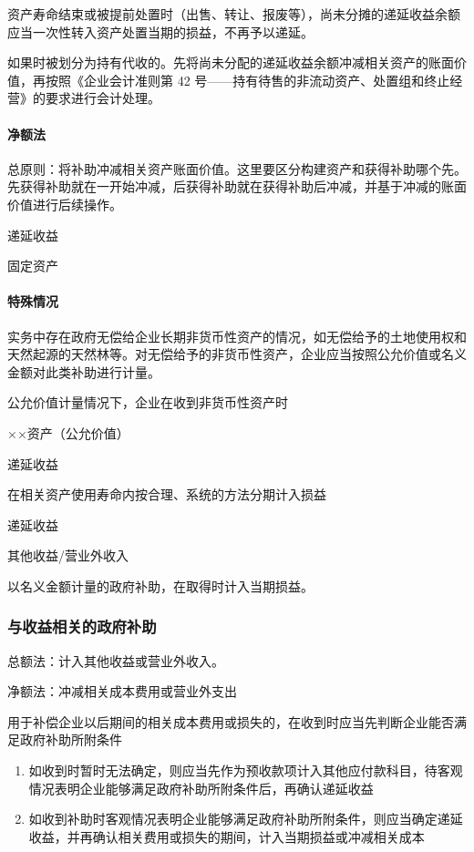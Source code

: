 \documentclass[UTF8,12pt]{ctexart}
\newenvironment{Dr}{%
	\begin{list}{}%
		{
			\setlength{\leftmargin}{2em}
			\setlength{\labelwidth}{2em}
			\setlength{\labelsep}{0pt}
			\setlength{\itemindent}{0pt}
			\setlength{\listparindent}{0pt}
			\setlength{\parsep}{0pt}
			\setlength{\topsep}{0pt}
		}
		\item[\textbf{借：}]
	}{%
	\end{list}
}
\newenvironment{Cr}{%
	\begin{list}{}%
		{
			\setlength{\leftmargin}{2em}
			\setlength{\labelwidth}{2em}
			\setlength{\labelsep}{0pt}
			\setlength{\itemindent}{0pt}
			\setlength{\listparindent}{0pt}
			\setlength{\parsep}{0pt}
			\setlength{\topsep}{0pt}
		}
		\item[\textbf{贷：}]
	}{%
	\end{list}
}
\numberwithin{equation}{section} %
\numberwithin{figure}{section}
\numberwithin{table}{section}
\begin{document}
	资产寿命结束或被提前处置时（出售、转让、报废等），尚未分摊的递延收益余额应当一次性转入资产处置当期的损益，不再予以递延。
	
	如果时被划分为持有代收的。先将尚未分配的递延收益余额冲减相关资产的账面价值，再按照《企业会计准则第 42 号——持有待售的非流动资产、处置组和终止经营》的要求进行会计处理。
	
	
	\paragraph{净额法}
	总原则：将补助冲减相关资产账面价值。这里要区分构建资产和获得补助哪个先。先获得补助就在一开始冲减，后获得补助就在获得补助后冲减，并基于冲减的账面价值进行后续操作。
	
	\begin{Dr}
		递延收益
	\end{Dr}
	\begin{Cr}
		固定资产
	\end{Cr}
	
	
	\paragraph{特殊情况}
	实务中存在政府无偿给企业长期非货币性资产的情况，如无偿给予的土地使用权和天然起源的天然林等。对无偿给予的非货币性资产，企业应当按照公允价值或名义金额对此类补助进行计量。
	
	公允价值计量情况下，企业在收到非货币性资产时
	\begin{Dr}
		××资产（公允价值）
	\end{Dr}
	\begin{Cr}
		递延收益
	\end{Cr}
	
	在相关资产使用寿命内按合理、系统的方法分期计入损益
	\begin{Dr}
		递延收益
	\end{Dr}
	\begin{Cr}
		其他收益/营业外收入
	\end{Cr}

	
	以名义金额计量的政府补助，在取得时计入当期损益。
	
	\subsubsection{与收益相关的政府补助}
	总额法：计入其他收益或营业外收入。
	
	净额法：冲减相关成本费用或营业外支出
	
	用于补偿企业以后期间的相关成本费用或损失的，在收到时应当先判断企业能否满足政府补助所附条件
	\begin{enumerate}
		\item 如收到时暂时无法确定，则应当先作为预收款项计入其他应付款科目，待客观情况表明企业能够满足政府补助所附条件后，再确认递延收益
		
		\item 如收到补助时客观情况表明企业能够满足政府补助所附条件，则应当确定递延收益，并再确认相关费用或损失的期间，计入当期损益或冲减相关成本
		
	\end{enumerate}
	
\end{document}
